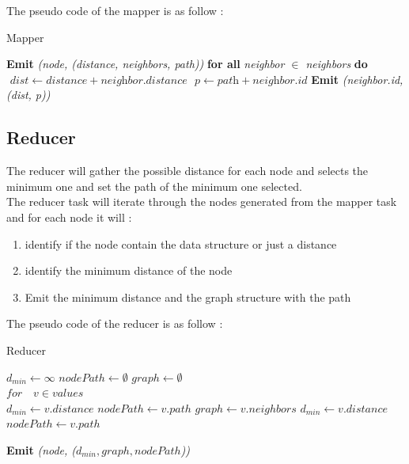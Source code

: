 \documentclass[english]{article}
\begin{document}
The pseudo code of the mapper is as follow : 
\begin{algorithm}[h]
\caption{Mapper}\label{mapper}
\begin{algorithmic}[1]
\State \textbf{Emit} \emph{(node, (distance, neighbors, path))}
\State \textbf{for all} \emph{ neighbor $ \in$ neighbors } \textbf{do}
\State $\textit{ dist} \gets \textit{distance} + \textit{neighbor.distance} $
\State $ \textit{ p} \gets \textit{path} + \textit{neighbor.id} $
\State \textbf{ Emit} \emph{(neighbor.id, (dist, p))}
\EndProcedure
\end{algorithmic}
\end{algorithm}

\newpage
\subsection{Reducer}
The reducer will gather the possible distance for each node and selects the minimum one and set the path of the minimum one selected.\\

The reducer task will iterate through the nodes generated from the mapper task and for each node it will :
\begin{enumerate}
\item identify if the node contain the data structure or just a distance
\item identify the minimum distance of the node
\item Emit the minimum distance and the graph structure with the path
\end{enumerate}

The pseudo code of the reducer is as follow : 
\begin{algorithm}[h]
\caption{Reducer}\label{reducer}
\begin{algorithmic}[1]
\State $ d_{min} \gets \infty $
\State $ nodePath \gets \emptyset $
\State $  graph  \gets \emptyset $ \\

\State $for \quad v \in values $ \\

	\State $ d_{min} \gets  v.distance  $
	\State $ nodePath \gets v.path $
	\State $ graph \gets  v.neighbors $
\Else{}
		\State $ d_{min} \gets  v.distance $
		\State $ nodePath \gets v.path $
	\EndIf
\EndIf

\State \textbf{ Emit} \emph{(node, ($d_{min}, graph, nodePath$))}

\EndProcedure
\end{algorithmic}
\end{algorithm}
\end{document}
